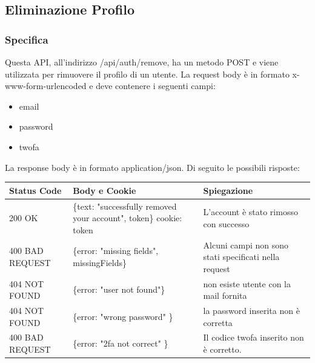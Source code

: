 \documentclass{report}
\begin{document}
\subsection{Eliminazione Profilo}
\subsubsection*{Specifica}
Questa API, all'indirizzo /api/auth/remove, ha un metodo POST e viene utilizzata per rimuovere il profilo di un utente.
La request body è in formato x-www-form-urlencoded e deve contenere i seguenti campi:
\begin{itemize}
	\item email
	\item password
	\item twofa
\end{itemize}
La response body è in formato application/json. Di seguito le possibili risposte:
\begin{center} %
	\centering
	\begin{tabular}{ |p{4cm}|p{5cm}|p{4cm}| }
		\hline
		\centering Status Code & \qquad\quad Body e Cookie & \qquad\qquad Spiegazione\\ %
		\hline
		200 OK & \{text: "successfully removed your account", token\} cookie: token & L'account è stato rimosso con successo	\\
		\hline
		400 BAD REQUEST & \{error: "missing fields", missingFields\} & Alcuni campi non sono stati specificati nella request\\ %
		\hline
		404 NOT FOUND & \{error: "user not found"\} & non esiste utente con la mail fornita \\%
		\hline
		404 NOT FOUND & \{error: "wrong password" \} & la password inserita non è corretta \\
		\hline
		400 BAD REQUEST & \{error: "2fa not correct" \} & Il codice twofa inserito non è corretto. \\
		\hline
	\end{tabular}
\end{center}
\end{document}
